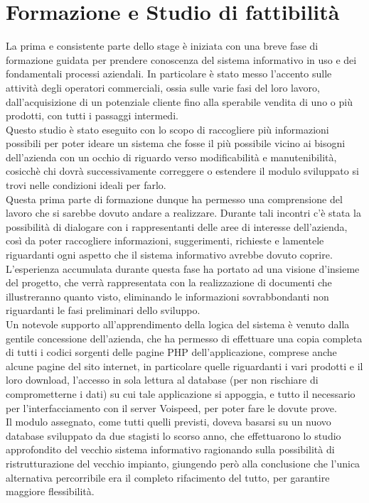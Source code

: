 \newpage
\section{Formazione e Studio di fattibilit\` a}
La prima e consistente parte dello stage \`e iniziata con una breve fase di formazione guidata per prendere conoscenza del sistema informativo in uso e dei fondamentali processi aziendali. In particolare \`e stato messo l'accento sulle attivit\`a degli operatori commerciali, ossia sulle varie fasi del loro lavoro, dall'acquisizione di un potenziale cliente fino alla sperabile vendita di uno o pi\`u prodotti, con tutti i passaggi intermedi. \\
Questo studio \`e stato eseguito con lo scopo di raccogliere pi\`u informazioni possibili per poter ideare un sistema che fosse il pi\`u possibile vicino ai bisogni dell'azienda con un occhio di riguardo verso modificabilit\`a e manutenibilit\`a, cosicch\`e chi dovr\`a successivamente correggere o estendere il modulo sviluppato si trovi nelle condizioni ideali per farlo. \\
Questa prima parte di formazione dunque ha permesso una comprensione del lavoro che si sarebbe dovuto andare a realizzare. Durante tali incontri c'\`e stata la possibilit\`a di dialogare con i rappresentanti delle aree di interesse dell'azienda, cos\`i da poter raccogliere informazioni, suggerimenti, richieste e lamentele riguardanti ogni aspetto che il sistema informativo avrebbe dovuto coprire. \\
L'esperienza accumulata durante questa fase ha portato ad una visione d'insieme del progetto, che verr\`a rappresentata con la realizzazione di documenti che illustreranno quanto visto, eliminando le informazioni sovrabbondanti non riguardanti le fasi preliminari dello sviluppo. \\
Un notevole supporto all'apprendimento della logica del sistema \`e venuto dalla gentile concessione dell'azienda, che ha permesso di effettuare una copia completa di tutti i codici sorgenti delle pagine PHP dell'applicazione, comprese anche alcune pagine del sito internet, in particolare quelle riguardanti i vari prodotti e il loro download, l'accesso in sola lettura al database (per non rischiare di comprometterne i dati) su cui tale applicazione si appoggia, e tutto il necessario per l'interfacciamento con il server Voispeed, per poter fare le dovute prove. \\
Il modulo assegnato, come tutti quelli previsti, doveva basarsi su un nuovo database sviluppato da due stagisti lo scorso anno, che effettuarono lo studio approfondito del vecchio sistema informativo ragionando sulla possibilit\`a di ristrutturazione del vecchio impianto, giungendo per\`o alla conclusione che l'unica alternativa percorribile era il completo rifacimento del tutto, per garantire maggiore flessibilit\`a. \\
